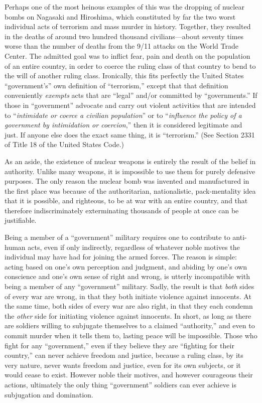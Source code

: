 \documentclass{book}
\begin{document}
Perhaps one of the most heinous examples of this was the dropping of nuclear bombs on Nagasaki and Hiroshima, which constituted by far the two worst individual acts of terrorism and mass murder in history. Together, they resulted in the deaths of around two hundred thousand civilians---about seventy times worse than the number of deaths from the 9/11 attacks on the World Trade Center. The admitted goal was to inflict fear, pain and death on the population of an entire country, in order to coerce the ruling class of that country to bend to the will of another ruling class. Ironically, this fits perfectly the United States \enquote{government's} own definition of \enquote{terrorism,} except that that definition conveniently \emph{exempts} acts that are \enquote{legal} and/or committed by \enquote{governments.} If those in \enquote{government} advocate and carry out violent activities that are intended to \enquote{\emph{intimidate or coerce a civilian population}} or to \enquote{\emph{influence the policy of a government by intimidation or coercion},} then it is considered legitimate and just. If anyone else does the exact same thing, it is \enquote{terrorism.} (See Section 2331 of Title 18 of the United States Code.)

As an aside, the existence of nuclear weapons is entirely the result of the belief in authority. Unlike many weapons, it is impossible to use them for purely defensive purposes. The only reason the nuclear bomb was invented and manufactured in the first place was because of the authoritarian, nationalistic, pack-mentality idea that it is possible, and righteous, to be at war with an entire country, and that therefore indiscriminately exterminating thousands of people at once can be justifiable.

Being a member of a \enquote{government} military requires one to contribute to anti-human acts, even if only indirectly, regardless of whatever noble motives the individual may have had for joining the armed forces. The reason is simple: acting based on one's own perception and judgment, and abiding by one's own conscience and one's own sense of right and wrong, is utterly incompatible with being a member of any \enquote{government} military. Sadly, the result is that \emph{both} sides of every war are wrong, in that they both initiate violence against innocents. At the same time, both sides of every war are also right, in that they each condemn the \emph{other} side for initiating violence against innocents. In short, as long as there are soldiers willing to subjugate themselves to a claimed \enquote{authority,} and even to commit murder when it tells them to, lasting peace will be impossible. Those who fight for any \enquote{government,} even if they believe they are \enquote{fighting for their country,} can never achieve freedom and justice, because a ruling class, by its very nature, never wants freedom and justice, even for its own subjects, or it would cease to exist. However noble their motives, and however courageous their actions, ultimately the only thing \enquote{government} soldiers can ever achieve is subjugation and domination.
\end{document}
